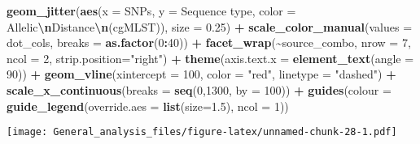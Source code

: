 \documentclass[
]{article}
\newenvironment{Shaded}{\begin{snugshade}}{\end{snugshade}}
\newcommand{\AttributeTok}[1]{\textcolor[rgb]{0.13,0.29,0.53}{#1}}
\newcommand{\DecValTok}[1]{\textcolor[rgb]{0.00,0.00,0.81}{#1}}
\newcommand{\FloatTok}[1]{\textcolor[rgb]{0.00,0.00,0.81}{#1}}
\newcommand{\FunctionTok}[1]{\textcolor[rgb]{0.13,0.29,0.53}{\textbf{#1}}}
\newcommand{\NormalTok}[1]{#1}
\newcommand{\SpecialCharTok}[1]{\textcolor[rgb]{0.81,0.36,0.00}{\textbf{#1}}}
\newcommand{\StringTok}[1]{\textcolor[rgb]{0.31,0.60,0.02}{#1}}
\begin{document}
\begin{Shaded}
\begin{Highlighting}[]
        \FunctionTok{geom\_jitter}\NormalTok{(}\FunctionTok{aes}\NormalTok{(}\AttributeTok{x =}\NormalTok{ SNPs, }\AttributeTok{y =} \StringTok{\textasciigrave{}}\AttributeTok{Sequence type}\StringTok{\textasciigrave{}}\NormalTok{, }\AttributeTok{color =} \StringTok{\textasciigrave{}}\AttributeTok{Allelic}\SpecialCharTok{\textbackslash{}n}\AttributeTok{Distance}\SpecialCharTok{\textbackslash{}n}\AttributeTok{(cgMLST)}\StringTok{\textasciigrave{}}\NormalTok{), }\AttributeTok{size =} \FloatTok{0.25}\NormalTok{) }\SpecialCharTok{+}
        \FunctionTok{scale\_color\_manual}\NormalTok{(}\AttributeTok{values =}\NormalTok{ dot\_cols, }\AttributeTok{breaks =} \FunctionTok{as.factor}\NormalTok{(}\DecValTok{0}\SpecialCharTok{:}\DecValTok{40}\NormalTok{)) }\SpecialCharTok{+}
        \FunctionTok{facet\_wrap}\NormalTok{(}\SpecialCharTok{\textasciitilde{}}\NormalTok{source\_combo, }\AttributeTok{nrow =} \DecValTok{7}\NormalTok{, }\AttributeTok{ncol =} \DecValTok{2}\NormalTok{, }\AttributeTok{strip.position=}\StringTok{"right"}\NormalTok{) }\SpecialCharTok{+}
        \FunctionTok{theme}\NormalTok{(}\AttributeTok{axis.text.x =} \FunctionTok{element\_text}\NormalTok{(}\AttributeTok{angle =} \DecValTok{90}\NormalTok{)) }\SpecialCharTok{+}
        \FunctionTok{geom\_vline}\NormalTok{(}\AttributeTok{xintercept =} \DecValTok{100}\NormalTok{, }\AttributeTok{color =} \StringTok{"red"}\NormalTok{, }\AttributeTok{linetype =} \StringTok{"dashed"}\NormalTok{) }\SpecialCharTok{+}
        \FunctionTok{scale\_x\_continuous}\NormalTok{(}\AttributeTok{breaks =} \FunctionTok{seq}\NormalTok{(}\DecValTok{0}\NormalTok{,}\DecValTok{1300}\NormalTok{, }\AttributeTok{by =} \DecValTok{100}\NormalTok{)) }\SpecialCharTok{+}
        \FunctionTok{guides}\NormalTok{(}\AttributeTok{colour =} \FunctionTok{guide\_legend}\NormalTok{(}\AttributeTok{override.aes =} \FunctionTok{list}\NormalTok{(}\AttributeTok{size=}\FloatTok{1.5}\NormalTok{), }\AttributeTok{ncol =} \DecValTok{1}\NormalTok{))}
\end{Highlighting}
\end{Shaded}

\texttt{[image: General\_analysis\_files/figure-latex/unnamed-chunk-28-1.pdf]}
\end{document}
